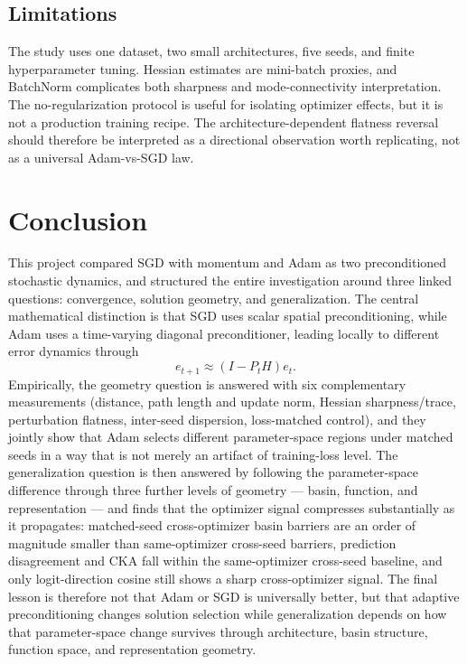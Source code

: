 \documentclass[11pt]{article}
\begin{document}
\subsection{Limitations}
\label{sec:limitations}

The study uses one dataset, two small architectures, five seeds, and finite hyperparameter tuning. Hessian estimates are mini-batch proxies, and BatchNorm complicates both sharpness and mode-connectivity interpretation. The no-regularization protocol is useful for isolating optimizer effects, but it is not a production training recipe. The architecture-dependent flatness reversal should therefore be interpreted as a directional observation worth replicating, not as a universal Adam-vs-SGD law.

\section{Conclusion}

This project compared SGD with momentum and Adam as two preconditioned stochastic dynamics, and structured the entire investigation around three linked questions: convergence, solution geometry, and generalization. The central mathematical distinction is that SGD uses scalar spatial preconditioning, while Adam uses a time-varying diagonal preconditioner, leading locally to different error dynamics through
\[
e_{t+1}\approx (I-P_tH)e_t.
\]
Empirically, the geometry question is answered with six complementary measurements (distance, path length and update norm, Hessian sharpness/trace, perturbation flatness, inter-seed dispersion, loss-matched control), and they jointly show that Adam selects different parameter-space regions under matched seeds in a way that is not merely an artifact of training-loss level. The generalization question is then answered by following the parameter-space difference through three further levels of geometry --- basin, function, and representation --- and finds that the optimizer signal compresses substantially as it propagates: matched-seed cross-optimizer basin barriers are an order of magnitude smaller than same-optimizer cross-seed barriers, prediction disagreement and CKA fall within the same-optimizer cross-seed baseline, and only logit-direction cosine still shows a sharp cross-optimizer signal. The final lesson is therefore not that Adam or SGD is universally better, but that adaptive preconditioning changes solution selection while generalization depends on how that parameter-space change survives through architecture, basin structure, function space, and representation geometry.
\end{document}
